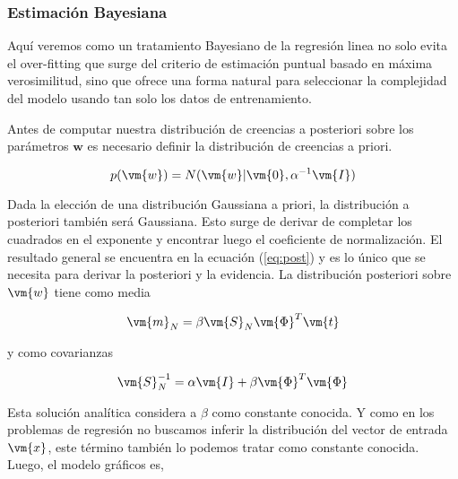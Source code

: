 \subsubsection{Estimaci\'on Bayesiana}

Aqu\'i veremos como un tratamiento Bayesiano de la regresi\'on linea no solo evita el over-fitting que surge del criterio de estimaci\'on puntual basado en m\'axima verosimilitud, sino que ofrece una forma natural para seleccionar la complejidad del modelo usando tan solo los datos de entrenamiento.

\vspace{0.3cm}

Antes de computar nuestra distribuci\'on de creencias a posteriori sobre los par\'ametros $\bm{w}$ es necesario definir la distribuci\'on de creencias a priori.

\begin{equation}
 p(\vm{w}) = N(\vm{w}| \vm{0}, \alpha^{-1} \vm{I})
\end{equation}

Dada la elecci\'on de una distribuci\'on Gaussiana a priori, la distribuci\'on a posteriori tambi\'en ser\'a Gaussiana.
Esto surge de derivar de completar los cuadrados en el exponente y encontrar luego el coeficiente de normalizaci\'on.
El resultado general se encuentra en la ecuaci\'on (\ref{eq:post}) y es lo \'unico que se necesita para derivar la posteriori y la evidencia.
La distribuci\'on posteriori sobre $\vm{w}$ tiene como media

\begin{equation}
 \vm{m}_N = \beta  \vm{S}_N\vm{\Phi}^T \vm{t}
\end{equation}

y como covarianzas

\begin{equation}
 \vm{S}_N^{-1} = \alpha \vm{I} + \beta \vm{\Phi}^T\vm{\Phi}
\end{equation}

Esta soluci\'on anal\'itica considera a $\beta$ como constante conocida.
Y como en los problemas de regresi\'on no buscamos inferir la distribuci\'on del vector de entrada $\vm{x}$, este t\'ermino tambi\'en lo podemos tratar como constante conocida.
Luego, el modelo gr\'aficos es, 

\begin{figure}[H]
    \centering
\end{figure}

